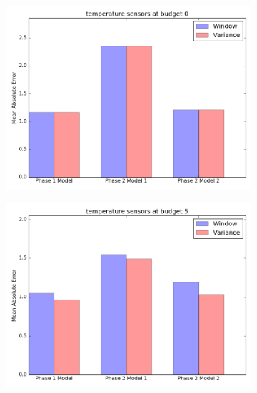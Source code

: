 \documentclass{article}
\begin{document}
\begin{figure}[h!]
	\begin{subfigure}{\linewidth}
	\includegraphics[scale=0.5]{temperature_0.png}
	\end{subfigure}
	\begin{subfigure}{\linewidth}
	\includegraphics[scale=0.5]{temperature_5.png}
	\end{subfigure}
\end{figure}

\newpage
\end{document}
